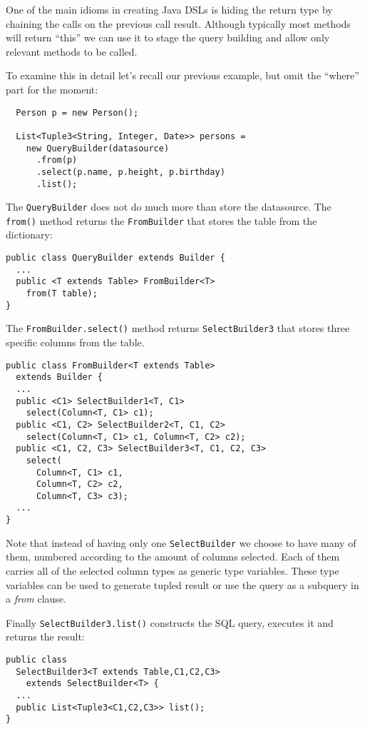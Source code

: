 \documentclass{sig-alternate}
\begin{document}
One of the main idioms in creating Java DSLs is hiding the return type by chaining the calls on the previous call result. Although typically most methods will return ``this'' we can use it to stage the query building and allow only relevant methods to be called.

To examine this in detail let's recall our previous example, but omit the ``where'' part for the moment:

\begin{verbatim}
  Person p = new Person();

  List<Tuple3<String, Integer, Date>> persons = 
    new QueryBuilder(datasource)
      .from(p)
      .select(p.name, p.height, p.birthday)
      .list();
\end{verbatim}


The \verb!QueryBuilder! does not do much more than store the datasource. The \verb!from()! method returns the \verb!FromBuilder! that stores the table from the dictionary:

\begin{verbatim}
public class QueryBuilder extends Builder {
  ...
  public <T extends Table> FromBuilder<T> 
    from(T table);
}
\end{verbatim}

The \verb!FromBuilder.select()! method returns \verb!SelectBuilder3! that stores three specific columns from the table. 

\begin{verbatim}
public class FromBuilder<T extends Table> 
  extends Builder {
  ...
  public <C1> SelectBuilder1<T, C1> 
    select(Column<T, C1> c1);
  public <C1, C2> SelectBuilder2<T, C1, C2> 
    select(Column<T, C1> c1, Column<T, C2> c2);
  public <C1, C2, C3> SelectBuilder3<T, C1, C2, C3> 
    select(
      Column<T, C1> c1, 
      Column<T, C2> c2, 
      Column<T, C3> c3);
  ...
}
\end{verbatim}

Note that instead of having only one \verb!SelectBuilder! we choose to have many of them, numbered according to the amount of columns selected. Each of them carries all of the selected column types as generic type variables. These type variables can be used to generate tupled result or use the query as a subquery in a \emph{from} clause.

Finally \verb!SelectBuilder3.list()! constructs the SQL query, executes it and returns the result:

\begin{verbatim}
public class
  SelectBuilder3<T extends Table,C1,C2,C3> 
    extends SelectBuilder<T> {
  ...
  public List<Tuple3<C1,C2,C3>> list();
} 
\end{verbatim}
\end{document}
